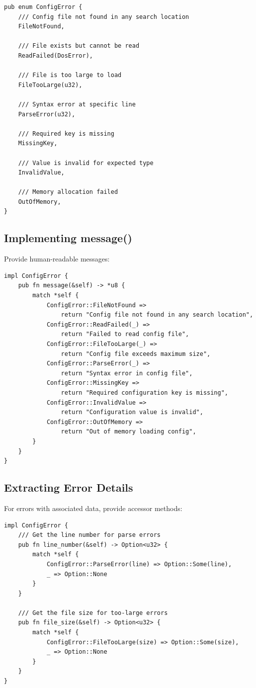 \begin{lstlisting}
pub enum ConfigError {
    /// Config file not found in any search location
    FileNotFound,

    /// File exists but cannot be read
    ReadFailed(DosError),

    /// File is too large to load
    FileTooLarge(u32),

    /// Syntax error at specific line
    ParseError(u32),

    /// Required key is missing
    MissingKey,

    /// Value is invalid for expected type
    InvalidValue,

    /// Memory allocation failed
    OutOfMemory,
}
\end{lstlisting}

\subsection{Implementing message()}

Provide human-readable messages:

\begin{lstlisting}
impl ConfigError {
    pub fn message(&self) -> *u8 {
        match *self {
            ConfigError::FileNotFound =>
                return "Config file not found in any search location",
            ConfigError::ReadFailed(_) =>
                return "Failed to read config file",
            ConfigError::FileTooLarge(_) =>
                return "Config file exceeds maximum size",
            ConfigError::ParseError(_) =>
                return "Syntax error in config file",
            ConfigError::MissingKey =>
                return "Required configuration key is missing",
            ConfigError::InvalidValue =>
                return "Configuration value is invalid",
            ConfigError::OutOfMemory =>
                return "Out of memory loading config",
        }
    }
}
\end{lstlisting}

\subsection{Extracting Error Details}

For errors with associated data, provide accessor methods:

\begin{lstlisting}
impl ConfigError {
    /// Get the line number for parse errors
    pub fn line_number(&self) -> Option<u32> {
        match *self {
            ConfigError::ParseError(line) => Option::Some(line),
            _ => Option::None
        }
    }

    /// Get the file size for too-large errors
    pub fn file_size(&self) -> Option<u32> {
        match *self {
            ConfigError::FileTooLarge(size) => Option::Some(size),
            _ => Option::None
        }
    }
}
\end{lstlisting}

